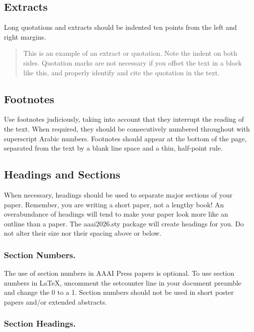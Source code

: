 \subsection{Extracts}

Long quotations and extracts should be indented ten points from the left
and right margins.

\begin{quote}
This is an example of an extract or quotation. Note the indent on both sides. Quotation marks are not necessary if you offset the text in a block like this, and properly identify and cite the quotation in the text.

\end{quote}

\subsection{Footnotes}

Use footnotes judiciously, taking into account that they interrupt the
reading of the text. When required, they should be consecutively
numbered throughout with superscript Arabic numbers. Footnotes should
appear at the bottom of the page, separated from the text by a blank
line space and a thin, half-point rule.

\subsection{Headings and Sections}

When necessary, headings should be used to separate major sections of
your paper. Remember, you are writing a short paper, not a lengthy book!
An overabundance of headings will tend to make your paper look more like
an outline than a paper. The aaai2026.sty package will create headings
for you. Do not alter their size nor their spacing above or below.

\subsubsection{Section Numbers.}

The use of section numbers in AAAI Press papers is optional. To use
section numbers in \LaTeX{}, uncomment the setcounter line in your
document preamble and change the 0 to a 1. Section numbers should not be
used in short poster papers and/or extended abstracts.

\subsubsection{Section Headings.}

